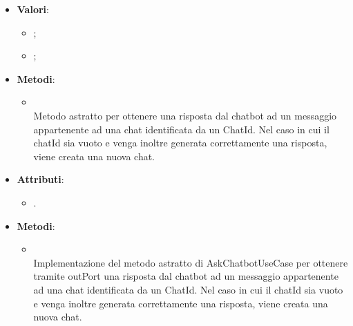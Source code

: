 \documentclass[10pt, a4paper]{article}
\begin{document}
    \label{MessageSenderDettaglio}
    \begin{itemize}
        \item \textbf{Valori}:
        \begin{itemize}
            \item {};
            \item {};
        \end{itemize}
    \end{itemize}
    
    \label{AskChatbotUseCaseDettaglio}
    \begin{itemize}
        \item \textbf{Metodi}:
        \begin{itemize}
            \item {}\\
            Metodo astratto per ottenere una risposta dal chatbot ad un messaggio appartenente ad una chat identificata da un ChatId. Nel caso in cui il chatId sia vuoto e venga inoltre generata correttamente una risposta, viene creata una nuova chat.
        \end{itemize}
    \end{itemize}
    
    \label{AskChatbotServiceDettaglio}
    \begin{itemize}
        \item \textbf{Attributi}:
        \begin{itemize}
            \item {}.
        \end{itemize}
        \item \textbf{Metodi}:
        \begin{itemize}
            \item {}\\
            Implementazione del metodo astratto di AskChatbotUseCase per ottenere tramite outPort una risposta dal chatbot ad un messaggio appartenente ad una chat identificata da un ChatId. Nel caso in cui il chatId sia vuoto e venga inoltre generata correttamente una risposta, viene creata una nuova chat.
        \end{itemize}
    \end{itemize}
    
\end{document}
